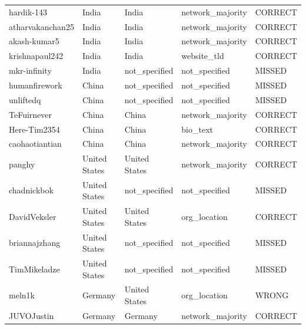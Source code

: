 \documentclass[11pt,a4paper]{article}
\begin{document}
\begin{longtable}{>{\ttfamily\small}p{4.4cm} p{3.0cm} p{3.0cm} p{2.6cm} p{1.6cm}}
\rowcolor{correct}  hardik-143               & India          & India          & network\_majority & CORRECT \\
\rowcolor{correct}  atharvakanchan25         & India          & India          & network\_majority & CORRECT \\
\rowcolor{correct}  akash-kumar5             & India          & India          & network\_majority & CORRECT \\
\rowcolor{correct}  krishnapaul242           & India          & India          & website\_tld     & CORRECT \\
\rowcolor{missed}   mkr-infinity             & India          & not\_specified & not\_specified   & MISSED  \\
\rowcolor{missed}   humanfirework            & China          & not\_specified & not\_specified   & MISSED  \\
\rowcolor{missed}   unliftedq                & China          & not\_specified & not\_specified   & MISSED  \\
\rowcolor{correct}  TeFuirnever              & China          & China          & network\_majority & CORRECT \\
\rowcolor{correct}  Here-Tim2354             & China          & China          & bio\_text        & CORRECT \\
\rowcolor{correct}  caohaotiantian           & China          & China          & network\_majority & CORRECT \\
\rowcolor{correct}  panghy                   & United States  & United States  & network\_majority & CORRECT \\
\rowcolor{missed}   chadnickbok              & United States  & not\_specified & not\_specified   & MISSED  \\
\rowcolor{correct}  DavidVeksler             & United States  & United States  & org\_location    & CORRECT \\
\rowcolor{missed}   briannajzhang            & United States  & not\_specified & not\_specified   & MISSED  \\
\rowcolor{missed}   TimMikeladze             & United States  & not\_specified & not\_specified   & MISSED  \\
\rowcolor{wrong}    meln1k                   & Germany        & United States  & org\_location    & WRONG   \\
\rowcolor{correct}  JUVOJustin               & Germany        & Germany        & network\_majority & CORRECT \\

\end{longtable}
\end{document}
